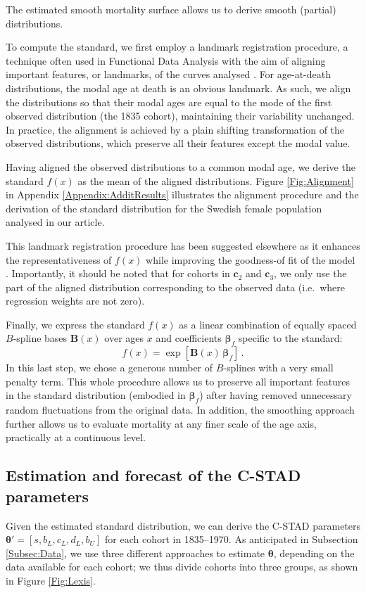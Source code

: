 \documentclass[11pt, a4paper]{article}
\begin{document}
The estimated smooth mortality surface allows us to derive smooth (partial) distributions. {\color{red}To compute the standard, we first employ a landmark registration procedure, a technique often used in Functional Data Analysis with the aim of aligning important features, or landmarks, of the curves analysed \citep{ramsay2005FDA}. For age-at-death distributions, the modal age at death is an obvious landmark. As such, we align the distributions so that their modal ages are equal to the mode of the first observed distribution (the 1835 cohort), maintaining their variability unchanged. In practice, the alignment is achieved by a plain shifting transformation of the observed distributions, which preserve all their features except the modal value. 

Having aligned the observed distributions to a common modal age, we derive the standard $f(x)$ as the mean of the aligned distributions. Figure \ref{Fig:Alignment} in Appendix \ref{Appendix:AdditResults} illustrates the alignment procedure and the derivation of the standard distribution for the Swedish female population analysed in our article.} This landmark registration procedure has been suggested elsewhere as it enhances the representativeness of $f(x)$ while improving the goodness-of fit of the model \cite[for additional details, see][]{basellini2019modelling}. Importantly, it should be noted that for cohorts in $\bm{c}_2$ and $\bm{c}_3$, we only use the part of the aligned distribution corresponding  to the observed data (i.e.~where regression weights are not zero). 

Finally, we express the standard $f(x)$ as a linear combination of equally spaced $B$-spline bases $\bm{B}(x)$ over ages $x$ and coefficients $\bm{\beta}_{f}$ specific to the standard:
%
\begin{equation}\label{Eq:standPsplines}
f(x) = \exp\left[ \bm{B}(x) \, \bm{\beta}_{f} \right] \, .
\end{equation}
In this last step, we chose a generous number of $B$-splines with a {\color{red}very small} penalty term. This whole procedure allows us to preserve all important features in the standard distribution (embodied in $\bm{\beta}_{f}$) after having removed unnecessary random fluctuations from the original data. {\color{red}In addition, the smoothing approach further allows us to evaluate mortality at any finer scale of the age axis, practically at a continuous level.}


\subsection{Estimation and forecast of the C-STAD parameters}
\label{Subsec:EstimForeC-STAD}
Given the estimated standard distribution, we can derive the C-STAD parameters $\bm{\theta}'=\left[s,b_{L},c_{L},d_{L},b_{U}\right]$ for each cohort in 1835--1970. As anticipated in Subsection \ref{Subsec:Data}, we use three different approaches to estimate $\bm{\theta}$, depending on the data available for each cohort; we thus divide cohorts into three groups, as shown in Figure \ref{Fig:Lexis}. 
\end{document}
